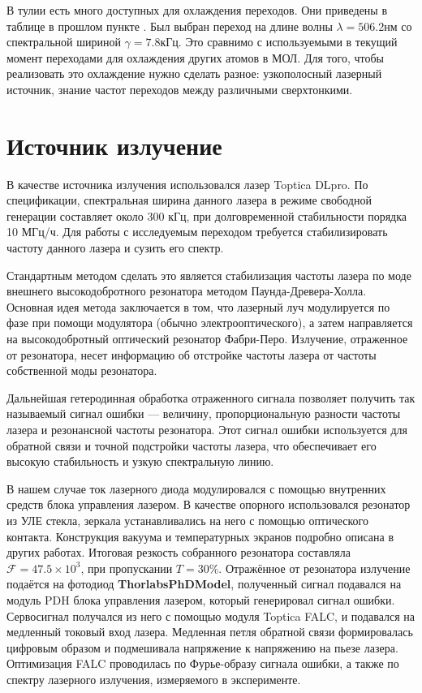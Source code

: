 В тулии есть много доступных для охлаждения переходов. 
Они приведены в таблице в прошлом пункте .
Был выбран переход на длине волны $\lambda = 506.2\unit{нм}$ со спектральной шириной $\gamma =  7.8\unit{кГц}$.
Это сравнимо с используемыми в текущий момент переходами для охлаждения других атомов в МОЛ.  
Для того, чтобы реализовать это охлаждение нужно сделать разное: узкополосный лазерный источник, знание частот переходов между различными сверхтонкими. 

\section{Источник излучение}

В качестве источника излучения использовался лазер Toptica DLpro. 
По спецификации, спектральная ширина данного лазера в режиме свободной генерации составляет около 300 кГц, при долговременной стабильности порядка 10 МГц/ч.  
Для работы с исследуемым переходом требуется стабилизировать частоту данного лазера и сузить его спектр. 

Стандартным методом сделать это является стабилизация частоты лазера по моде внешнего высокодобротного резонатора методом Паунда-Древера-Холла.
Основная идея метода заключается в том, что лазерный луч модулируется по фазе при помощи модулятора (обычно электрооптического), а затем направляется на высокодобротный оптический резонатор Фабри-Перо. 
Излучение, отраженное от резонатора, несет информацию об отстройке частоты лазера от частоты собственной моды резонатора.

Дальнейшая гетеродинная обработка отраженного сигнала позволяет получить так называемый сигнал ошибки — величину, пропорциональную разности частоты лазера и резонансной частоты резонатора. 
Этот сигнал ошибки используется для обратной связи и точной подстройки частоты лазера, что обеспечивает его высокую стабильность и узкую спектральную линию.

В нашем случае ток лазерного диода модулировался с помощью внутренних средств блока управления лазером. 
В качестве опорного использовался резонатор из УЛЕ стекла, зеркала устанавливались на него с помощью оптического контакта.
Конструкция вакуума и температурных экранов подробно описана в других работах.  
Итоговая резкость собранного резонатора составляла $\mathcal{F} = 47.5\times10^3$, при пропускании $T = 30\%$.
Отражённое от резонатора излучение подаётся на фотодиод \textbf{ThorlabsPhDModel}, полученный сигнал подавался на модуль PDH блока управления лазером, который генерировал сигнал ошибки.
Сервосигнал получался из него с помощью модуля Toptica FALC, и подавался на медленный токовый вход лазера. 
Медленная петля обратной связи формировалась цифровым образом и подмешивала напряжение к напряжению на пьезе лазера. 
Оптимизация FALC проводилась по Фурье-образу сигнала ошибки, а также по спектру лазерного излучения, измеряемого в эксперименте. 

